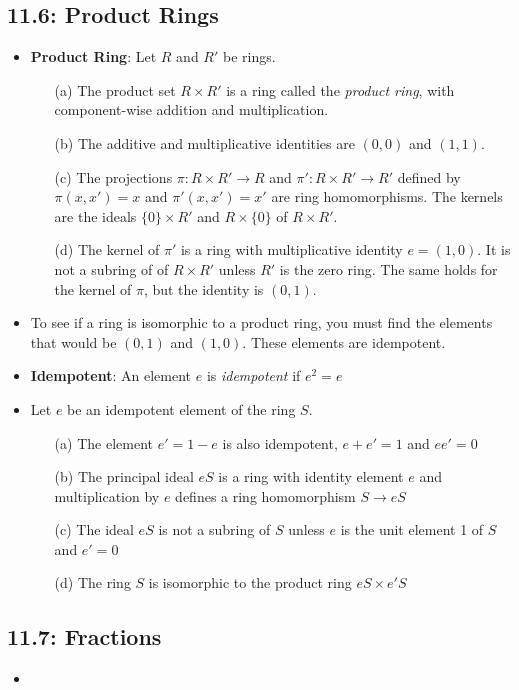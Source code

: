 \documentclass[12pt]{article}
\begin{document}
\subsection*{11.6: Product Rings}
\begin{itemize}
  \item \textbf{Product Ring}: Let $R$ and $R'$ be rings.
  \begin{enumerate}
    \item[(a)] The product set $R \times R'$ is a ring called the \textit{product ring}, with component-wise addition and multiplication.
    \item[(b)] The additive and multiplicative identities are $(0,0)$ and $(1,1)$.
    \item[(c)] The projections $\pi: R \times R' \to R$ and $\pi': R \times R' \to R'$ defined by $\pi(x,x') = x$ and $\pi'(x,x') = x'$ are ring homomorphisms. The kernels are the ideals $\{0\} \times R'$ and $R \times \{0\}$ of $R \times R'$.
    \item[(d)] The kernel of $\pi'$ is a ring with multiplicative identity $e = (1,0)$. It is not a subring of of $R \times R'$ unless $R'$ is the zero ring. The same holds for the kernel of $\pi$, but the identity is $(0,1)$.
  \end{enumerate}
  \item To see if a ring is isomorphic to a product ring, you must find the elements that would be $(0,1)$ and $(1,0)$. These elements are idempotent.
  \item \textbf{Idempotent}: An element $e$ is \textit{idempotent} if $e^2 = e$
  \item Let $e$ be an idempotent element of the ring $S$.
  \begin{enumerate}
    \item[(a)] The element $e' = 1 - e$ is also idempotent, $e + e' = 1$ and $ee' = 0$
    \item[(b)] The principal ideal $eS$ is a ring with identity element $e$ and multiplication by $e$ defines a ring homomorphism $S \to eS$
    \item[(c)] The ideal $eS$ is not a subring of $S$ unless $e$ is the unit element 1 of $S$ and $e' = 0$
    \item[(d)] The ring $S$ is isomorphic to the product ring $eS \times e'S$
  \end{enumerate}
\end{itemize}

\subsection*{11.7: Fractions}
\begin{itemize}
  \item 
\end{itemize}
\end{document}
